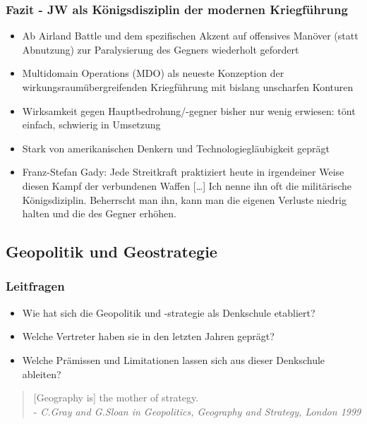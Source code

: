 {}\documentclass[a4paper]{article}
\providecommand{\tightlist}{\setlength{\itemsep}{1mm}\setlength{\parskip}{1mm}}
\begin{document}
\subsubsection{Fazit - JW als Königsdisziplin der modernen
	Kriegführung}\label{fazit---jw-als-kuxf6nigsdisziplin-der-modernen-kriegfuxfchrung}

\begin{itemize}
	\tightlist
	\item
	      Ab Airland Battle und dem spezifischen Akzent auf offensives Manöver
	      (statt Abnutzung) zur Paralysierung des Gegners wiederholt gefordert
	\item
	      Multidomain Operations (MDO) als neueste Konzeption der
	      wirkungsraumübergreifenden Kriegführung mit bislang unscharfen
	      Konturen
	\item
	      Wirksamkeit gegen Hauptbedrohung/-gegner bisher nur wenig erwiesen:
	      tönt einfach, schwierig in Umsetzung
	\item
	      Stark von amerikanischen Denkern und Technologiegläubigkeit geprägt
	\item
	      Franz-Stefan Gady: Jede Streitkraft praktiziert heute in irgendeiner
	      Weise diesen Kampf der verbundenen Waffen {[}\ldots{]} Ich nenne ihn
	      oft die militärische Königsdiziplin. Beherrscht man ihn, kann man die
	      eigenen Verluste niedrig halten und die des Gegner erhöhen.
\end{itemize}

\subsection{Geopolitik und
	Geostrategie}\label{geopolitik-und-geostrategie}

\subsubsection{Leitfragen}\label{leitfragen-1}

\begin{itemize}
	\tightlist
	\item
	      Wie hat sich die Geopolitik und -strategie als Denkschule etabliert?
	\item
	      Welche Vertreter haben sie in den letzten Jahren geprägt?
	\item
	      Welche Prämissen und Limitationen lassen sich aus dieser Denkschule
	      ableiten?
\end{itemize}

\begin{quote}
	{[}Geography is{]} the mother of strategy.\\
	- \emph{C.Gray and G.Sloan in Geopolitics, Geography and Strategy,
		London 1999}
\end{quote}
\end{document}
